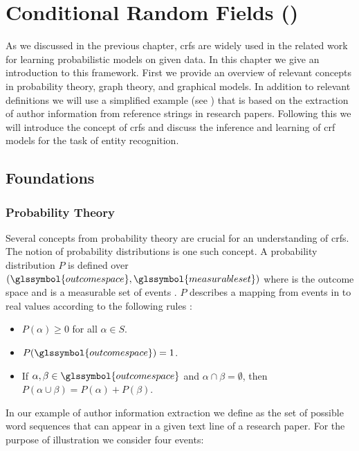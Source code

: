 \chapter{Conditional Random Fields ()}\label{cha:crfs}


As we discussed in the previous chapter, \glspl{crf} are widely used in the related work for learning probabilistic models on given data.
In this chapter we give an introduction to this framework.
First we provide an overview of relevant concepts in probability theory, graph theory, and graphical models.
In addition to relevant definitions we will use a simplified example (see ) that is based on the extraction of author information from reference strings in research papers.
Following this we will introduce the concept of \glspl{crf} and discuss the inference and learning of \gls{crf} models for the task of entity recognition.

\section{Foundations}\label{sec:foundations}
\subsection{Probability Theory}\label{subsec:probability-theory}
Several concepts from probability theory are crucial for an understanding of \glspl{crf}.
The notion of \glspl{probability distribution} is one such concept.
A \gls{probability distribution} $P$ is defined over $(\glssymbol{outcome space},\glssymbol{measurable set})$ where  is the \gls{outcome space} and  is a \gls{measurable set} of \glspl{event} \citep{koller2009probabilistic}.
$P$ describes a mapping from events in  to real values according to the following rules \citep{koller2009probabilistic}:
\begin{itemize}
  \item $P(\alpha)\geq 0 $ for all $ \alpha \in S$.
  \item $P(\glssymbol{outcome space})=1$.
  \item If $\alpha,\beta\in \glssymbol{outcome space}$ and $\alpha\cap\beta = \emptyset$, then $P(\alpha\cup\beta)=P(\alpha)+P(\beta)$.
\end{itemize}

In our example of author information extraction we define  as the set of possible word sequences that can appear in a given text line of a research paper.
For the purpose of illustration we consider four events:

